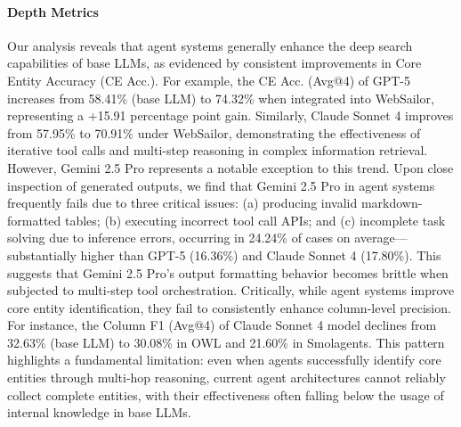 \documentclass[11pt, letterpaper, logo, onecolumn, copyright, numbering]{paper_improved}
\begin{document}
\paragraph{Depth Metrics}
Our analysis reveals that agent systems generally enhance the deep search capabilities of base LLMs, as evidenced by consistent improvements in Core Entity Accuracy (CE Acc.). For example, the CE Acc. (Avg@4) of GPT-5 increases from 58.41\% (base LLM) to 74.32\% when integrated into WebSailor, representing a +15.91 percentage point gain. Similarly, Claude Sonnet 4 improves from 57.95\% to 70.91\% under WebSailor, demonstrating the effectiveness of iterative tool calls and multi-step reasoning in complex information retrieval. However, Gemini 2.5 Pro represents a notable exception to this trend. Upon close inspection of generated outputs, we find that Gemini 2.5 Pro in agent systems frequently fails due to three critical issues: (a) producing invalid markdown-formatted tables; (b) executing incorrect tool call APIs; and (c) incomplete task solving due to inference errors, occurring in 24.24\% of cases on average—substantially higher than GPT-5 (16.36\%) and Claude Sonnet 4 (17.80\%). This suggests that Gemini 2.5 Pro's output formatting behavior becomes brittle when subjected to multi-step tool orchestration.
Critically, while agent systems improve core entity identification, they fail to consistently enhance column-level precision. For instance, the Column F1 (Avg@4) of  Claude Sonnet 4 model declines from 32.63\% (base LLM) to 30.08\% in OWL and 21.60\% in Smolagents. This pattern highlights a fundamental limitation: even when agents successfully identify core entities through multi-hop reasoning, current agent architectures cannot reliably collect complete entities, with their effectiveness often falling below the usage of internal knowledge in base LLMs.

\end{document}
